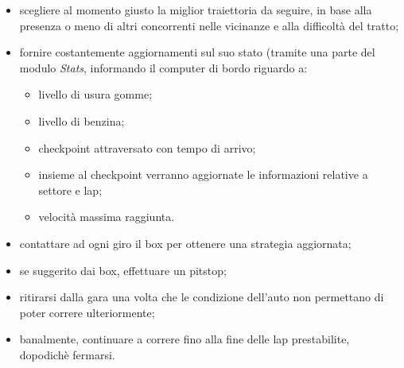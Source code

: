 	\begin{itemize}
		\item scegliere al momento giusto la miglior traiettoria da seguire, in base alla presenza o meno di altri concorrenti
			nelle vicinanze e alla difficolt\`{a} del tratto;
		\item fornire costantemente aggiornamenti sul suo stato (tramite una parte del modulo \emph{Stats}, informando il computer di bordo
			riguardo a:
			\begin{itemize}
				\item livello di usura gomme;
				\item livello di benzina;
				\item checkpoint attraversato con tempo di arrivo;
				\item insieme al checkpoint verranno aggiornate le informazioni relative a settore e lap;
				\item velocit\`{a} massima raggiunta.
			\end{itemize}
		\item contattare ad ogni giro il box per ottenere una strategia aggiornata;
		\item se suggerito dai box, effettuare un pitstop;
		\item ritirarsi dalla gara una volta che le condizione dell'auto non permettano di poter correre ulteriormente;
		\item banalmente, continuare a correre fino alla fine delle lap prestabilite, dopodich\`{e} fermarsi.
	\end{itemize}
